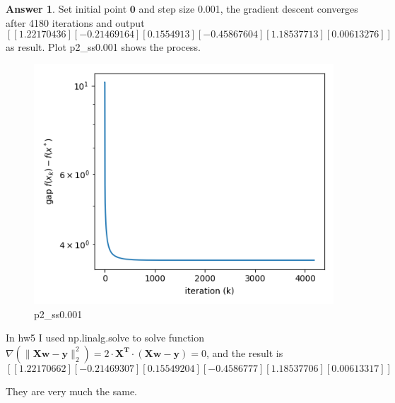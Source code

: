 \documentclass{article}
\theoremstyle{definition}
\newtheorem{ans}{Answer}
\begin{document}
	\begin{ans}
		Set initial point $\boldsymbol{0}$ and step size 0.001, the gradient descent converges after 4180 iterations and output 
		$$
		[[ 1.22170436]
		[-0.21469164]
		[ 0.1554913 ]
		[-0.45867604]
		[ 1.18537713]
		[ 0.00613276]]
		$$ as result. Plot p2\_ss0.001 shows the process.
		
		\begin{figure}
			\centering
			\includegraphics[width=0.5\linewidth]{../figures/p2_ss0.001}
			\caption{p2\_ss0.001}
			\label{fig:p2ss0}
		\end{figure}		
		
		In hw5 I used np.linalg.solve to solve function $\nabla (\|\boldsymbol{X} \boldsymbol{w}-\boldsymbol{y}\|_{2}^{2})=2\cdot\boldsymbol{X^T}\cdot(\boldsymbol{X} \boldsymbol{w}-\boldsymbol{y})=0$, and the result is 
		$$
		[[ 1.22170662]
		[-0.21469307]
		[ 0.15549204]
		[-0.4586777 ]
		[ 1.18537706]
		[ 0.00613317]]
		$$ 
		
		They are very much the same.
	\end{ans}
\end{document}

